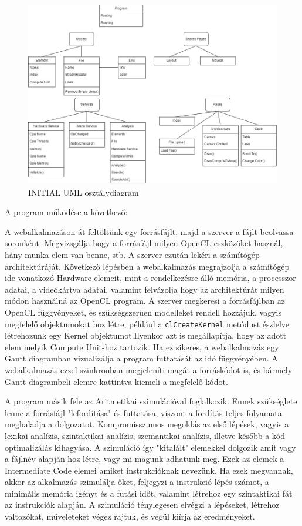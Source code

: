 \begin{figure}[h]
\centering
\includegraphics[scale=0.5]{images/UML.jpg}
\caption{INITIAL UML osztálydiagram}
\label{fig:uml}
\end{figure}

A program működése a következő:

A webalkalmazáson át feltöltünk egy forrásfájlt, majd a szerver a fájlt beolvassa soronként. Megvizsgálja hogy a forrásfájl milyen OpenCL eszközöket használ, hány munka elem van benne, stb. A szerver ezután lekéri a számítógép architektúráját. Következő lépésben a webalkalmazás megrajzolja a számítógép ide vonatkozó Hardware elemeit, mint a rendelkezésre álló memória, a processzor adatai, a videókártya adatai, valamint felvázolja hogy az architektúrát milyen módon használná az OpenCL program. A szerver megkeresi a forrásfájlban az OpenCL függvényeket, és szükségszerűen modelleket rendell hozzájuk, vagyis megfelelő objektumokat hoz létre, például a \texttt{clCreateKernel} metódust észlelve létrehozunk egy Kernel objektumot.Ilyenkor azt is megállapítja, hogy az adott elem melyik Compute Unit-hoz tartozik. Ha ez sikeres, a webalkalmazás egy Gantt diagramban vizualizálja a program futtatását az idő függvényében. A webalkalmazás ezzel szinkronban megjeleníti magát a forráskódot is, és bármely Gantt diagrambeli elemre kattintva kiemeli a megfelelő kódot.

A program másik fele az Aritmetikai szimulációval foglalkozik. Ennek szükséglete lenne a forrásfájl "lefordítása" és futtatása, viszont a fordítás teljes folyamata meghaladja a dolgozatot. Kompromisszumos megoldás az első lépések, vagyis a lexikai analízis, szintaktikai analízis, szemantikai analízis, illetve később a kód optimalizálás kihagyása. A szimuláció így "kitalált" elemekkel dolgozik amit vagy a fájlnév alapján hoz létre, vagy mi magunk adhatunk meg. Ezek az elemek a Intermediate Code elemei amiket instrukcióknak nevezünk. Ha ezek megvannak, akkor az alkalmazás szimulálja őket, feljegyzi a instrukció lépés számot, a minimális memória igényt és a futási időt, valamint létrehoz egy szintaktikai fát az instrukciók alapján. A szimuláció ténylegesen elvégzi a lépéseket, létrehoz változókat, műveleteket végez rajtuk, és végül kiírja az eredményeket.

